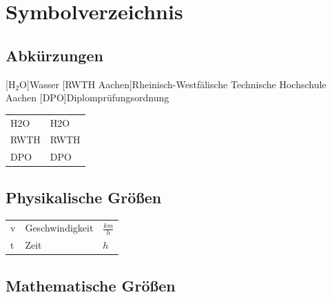 \chapter*{Symbolverzeichnis}										%



\section*{Abkürzungen}


[$\mathrm{H_2O}$]{Wasser}
[RWTH Aachen]{Rheinisch-Westfälische Technische Hochschule Aachen}
[DPO]{Diplomprüfungsordnung}


\begin{tabularx}{\textwidth}{p{}X}
\acs{H2O} & \acl{H2O} \\
\acs{RWTH} & \acl{RWTH}\\
\acs{DPO} & \acl{DPO}\\
\end{tabularx}

\section*{Physikalische Größen}

\begin{tabularx}{\textwidth}{p{}Xp{}}
$\mathrm{v}$ & Geschwindigkeit & $\frac{km}{h}$ \\
$\mathrm{t}$ & Zeit & $h$\\
\end{tabularx}

\section*{Mathematische Größen}

